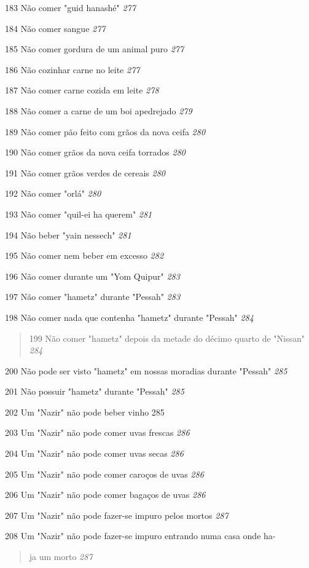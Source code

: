 183 Não comer "guid hanashé" \emph{277}

184 Não comer sangue \emph{277}

185 Não comer gordura de um animal puro \emph{277}

186 Não cozinhar carne no leite \emph{277}

187 Não comer carne cozida em leite \emph{278}

188 Não comer a carne de um boi apedrejado \emph{279}

189 Não comer pão feito com grãos da nova ceifa \emph{280}

190 Não comer grãos da nova ceifa torrados \emph{280}

191 Não comer grãos verdes de cereais \emph{280}

192 Não comer "orlá" \emph{280}

193 Não comer "quil-ei ha querem" \emph{281}

194 Não beber "yain nessech" \emph{281}

195 Não comer nem beber em excesso \emph{282}

196 Não comer durante um "Yom Quipur" \emph{283}

197 Não comer "hametz" durante "Pessah" \emph{283}

198 Não comer nada que contenha "hametz" durante "Pessah" \emph{284}

\begin{quote}
199 Não comer "hametz" depois da metade do décimo quarto de "Nissan"
\emph{284}
\end{quote}

200 Não pode ser visto "hametz" em nossas moradias durante "Pessah"
\emph{285}

201 Não possuir "hametz" durante "Pessah" \emph{285}

202 Um "Nazir" não pode beber vinho 285

203 Um "Nazir" não pode comer uvas frescas \emph{286}

204 Um "Nazir" não pode comer uvas secas \emph{286}

205 Um "Nazir" não pode comer caroços de uvas \emph{286}

206 Um "Nazir" não pode comer bagaços de uvas \emph{286}

207 Um "Nazir" não pode fazer-se impuro pelos mortos \emph{287}

208 Um "Nazir" não pode fazer-se impuro entrando numa casa onde ha-

\begin{quote}
ja um morto \emph{287}
\end{quote}

